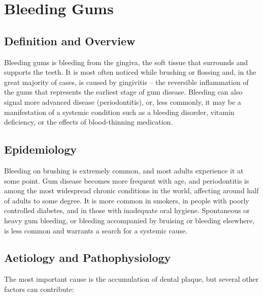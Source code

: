 \chapter{Bleeding Gums}

\section*{Definition and Overview}
Bleeding gums is bleeding from the gingiva, the soft tissue that surrounds and supports the teeth. It is most often noticed while brushing or flossing and, in the great majority of cases, is caused by gingivitis -- the reversible inflammation of the gums that represents the earliest stage of gum disease. Bleeding can also signal more advanced disease (periodontitis), or, less commonly, it may be a manifestation of a systemic condition such as a bleeding disorder, vitamin deficiency, or the effects of blood-thinning medication.

\section*{Epidemiology}
Bleeding on brushing is extremely common, and most adults experience it at some point. Gum disease becomes more frequent with age, and periodontitis is among the most widespread chronic conditions in the world, affecting around half of adults to some degree. It is more common in smokers, in people with poorly controlled diabetes, and in those with inadequate oral hygiene. Spontaneous or heavy gum bleeding, or bleeding accompanied by bruising or bleeding elsewhere, is less common and warrants a search for a systemic cause.

\section*{Aetiology and Pathophysiology}
The most important cause is the accumulation of dental plaque, but several other factors can contribute:

